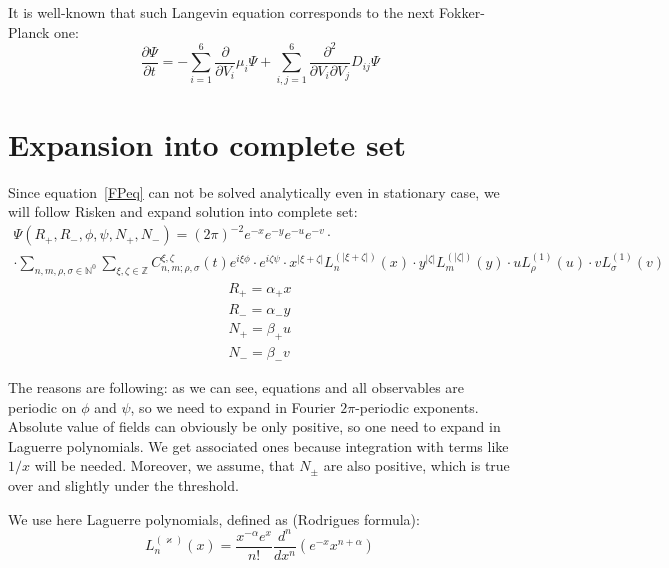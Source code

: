 \documentclass[12pt, notitlepage]{report}
\begin{document}
	It is well-known that such Langevin equation corresponds to the next Fokker-Planck one:
	\begin{equation}
		\label{FPeq}
		\frac{\partial \Psi}{\partial t} = -\sum\limits_{i=1}^6 \frac{\partial}{\partial V_i} \mu_i\Psi + \sum\limits_{i,j=1}^6 \frac{\partial^2}{\partial V_i\partial V_j}D_{ij}\Psi
	\end{equation}

	\section{Expansion into complete set}
Since equation~\eqref{FPeq} can not be solved analytically even in stationary case, we will follow Risken and expand solution into complete set:
\newcommand{\Lagg}[3]{L_{#1}^{(#2)}\!\!\left(#3\right)}
\begin{multline}
	\label{expansion}
	\Psi(R_+, R_-, \phi, \psi, N_+, N_-) =(2\pi)^{-2} e^{-x}e^{-y}e^{-u}e^{-v} \cdot \\ \cdot \sum\limits_{n,m,\rho,\sigma\in \mathbb{N}^0}\sum\limits_{\xi,\zeta\in\mathbb{Z}} C^{\xi, \zeta}_{n,m; \rho, \sigma}(t) e^{i\xi \phi} \cdot e^{i\zeta \psi} \cdot  x^{|\xi+\zeta|}\Lagg{n}{|\xi+\zeta|}{x} \cdot y^{|\zeta|}\Lagg{m}{|\zeta|}{y} \cdot
	 u\Lagg{\rho}{1}{u} \cdot v\Lagg{\sigma}{1}{v}
\end{multline}
\begin{gather*}
	R_+ = \alpha_+ x\\
	R_- = \alpha_- y\\
	N_+ = \beta_+ u \\
	N_- = \beta_- v
\end{gather*}

The reasons are following: as we can see, equations and all observables are periodic on $\phi$ and $\psi$, so we need to expand in Fourier $2\pi$-periodic exponents. Absolute value of fields can obviously be only positive, so one need to expand in Laguerre polynomials. We get associated ones because integration with terms like $1/x$ will be needed. Moreover, we assume, that $N_\pm$ are also positive, which is true over and slightly under the threshold.

We use here Laguerre polynomials, defined as (Rodrigues formula):
\begin{equation}
	\Lagg{n}{\varkappa}{x} = \frac{x^{-\alpha}e^x}{n!}\frac{d^n}{dx^n}\left(e^{-x}x^{n+\alpha}\right)
\end{equation}
\end{document}
